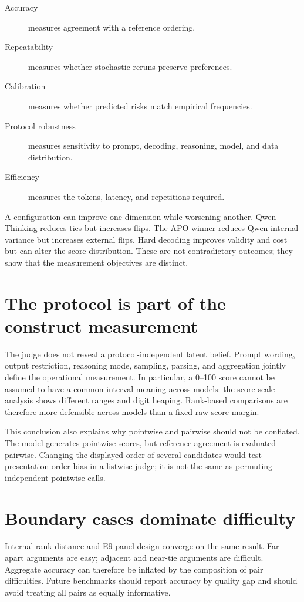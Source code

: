 \documentclass[11pt,twoside,a4paper]{report}
\begin{document}
\begin{description}
  \item[Accuracy] measures agreement with a reference ordering.
  \item[Repeatability] measures whether stochastic reruns preserve preferences.
  \item[Calibration] measures whether predicted risks match empirical frequencies.
  \item[Protocol robustness] measures sensitivity to prompt, decoding, reasoning,
  model, and data distribution.
  \item[Efficiency] measures the tokens, latency, and repetitions required.
\end{description}

A configuration can improve one dimension while worsening another.  Qwen Thinking
reduces ties but increases flips.  The APO winner reduces Qwen internal variance but
increases external flips.  Hard decoding improves validity and cost but can alter the
score distribution.  These are not contradictory outcomes; they show that the
measurement objectives are distinct.

\section{The protocol is part of the construct measurement}

The judge does not reveal a protocol-independent latent belief.  Prompt wording,
output restriction, reasoning mode, sampling, parsing, and aggregation jointly define
the operational measurement.  In particular, a 0--100 score cannot be assumed to
have a common interval meaning across models: the score-scale analysis shows
different ranges and digit heaping.  Rank-based comparisons are therefore more
defensible across models than a fixed raw-score margin.

This conclusion also explains why pointwise and pairwise should not be conflated.
The model generates pointwise scores, but reference agreement is evaluated pairwise.
Changing the displayed order of several candidates would test presentation-order
bias in a listwise judge; it is not the same as permuting independent pointwise calls.

\section{Boundary cases dominate difficulty}

Internal rank distance and E9 panel design converge on the same result.  Far-apart
arguments are easy; adjacent and near-tie arguments are difficult.  Aggregate
accuracy can therefore be inflated by the composition of pair difficulties.  Future
benchmarks should report accuracy by quality gap and should avoid treating all pairs
as equally informative.
\end{document}
